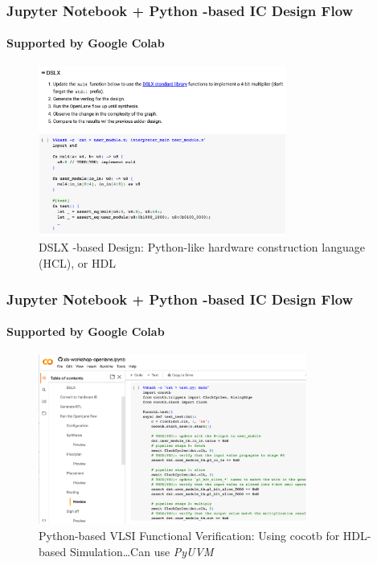\documentclass[xcolor={usenames,dvipsnames},hyperref={hyperindex,bookmarks}]{beamer}
\begin{document}
\begin{frame}
	\frametitle{Jupyter Notebook + Python -based IC Design Flow}
	\framesubtitle{Supported by Google Colab}
	
	\begin{figure}
		\centering
		\includegraphics[height=2.2in]{./pics/JupyterNotebookICDesign1}
		\caption{DSLX -based Design: Python-like hardware construction language (HCL), or HDL}
	\end{figure}
\end{frame}







\begin{frame}
	\frametitle{Jupyter Notebook + Python -based IC Design Flow}
	\framesubtitle{Supported by Google Colab}
	
	\begin{figure}
		\centering
		\includegraphics[height=2.2in]{./pics/JupyterNotebookICDesign2}
		\caption{Python-based VLSI Functional Verification: Using cocotb for HDL-based Simulation\dots Can use {\it PyUVM}}
	\end{figure}
\end{frame}
\end{document}
